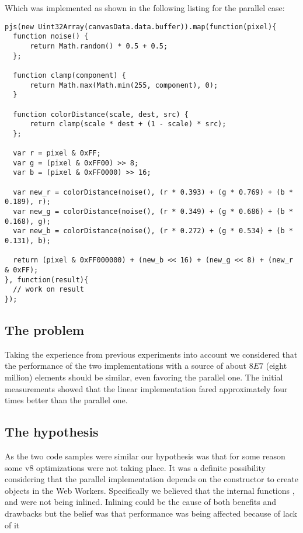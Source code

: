 Which was implemented as shown in the following listing for the parallel case:
\begin{lstlisting}[caption=Sepia tone initial parallel implementation]
pjs(new Uint32Array(canvasData.data.buffer)).map(function(pixel){
  function noise() {
      return Math.random() * 0.5 + 0.5;
  };

  function clamp(component) {
      return Math.max(Math.min(255, component), 0);
  }

  function colorDistance(scale, dest, src) {
      return clamp(scale * dest + (1 - scale) * src);
  };

  var r = pixel & 0xFF;
  var g = (pixel & 0xFF00) >> 8;
  var b = (pixel & 0xFF0000) >> 16;

  var new_r = colorDistance(noise(), (r * 0.393) + (g * 0.769) + (b * 0.189), r);
  var new_g = colorDistance(noise(), (r * 0.349) + (g * 0.686) + (b * 0.168), g);
  var new_b = colorDistance(noise(), (r * 0.272) + (g * 0.534) + (b * 0.131), b);

  return (pixel & 0xFF000000) + (new_b << 16) + (new_g << 8) + (new_r & 0xFF);
}, function(result){
  // work on result
});
\end{lstlisting}

\subsection{The problem}
Taking the experience from previous experiments into account we considered that the performance of the two implementations with a source  of about \(8E7\) (eight million) elements should be similar, even favoring the parallel one. The initial measurements showed that the linear implementation fared approximately four times better than the parallel one.

\subsection{The hypothesis}
As the two code samples were similar our hypothesis was that for some reason some v8 optimizations were not taking place. It was a definite possibility considering that the parallel implementation depends on the \tfunction constructor to create \tfunction objects in the Web Workers. Specifically we believed that the internal functions ,  and  were not being inlined. Inlining could be the cause of both benefits\cite{inline-pro} and drawbacks\cite{inline-cons} but the belief was that performance was being affected because of lack of it

